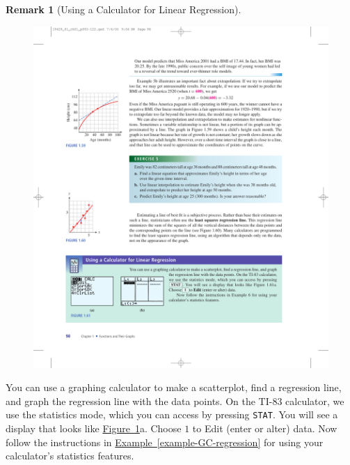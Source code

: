\documentclass[10pt,]{book}
\theoremstyle{plain}
\theoremstyle{definition}
\newtheorem{remark}[theorem]{Remark}
\theoremstyle{definition}
\theoremstyle{definition}
\theoremstyle{definition}
\numberwithin{equation}{part}
\begin{document}
\begin{remark}[Using a Calculator for Linear Regression]\label{remark-8}
\begin{figure}
\centering
\includegraphics[width=0.8\linewidth]{images/fig-GC-lists}
\caption{\label{fig-GC-lists}}
\end{figure}
You can use a graphing calculator to make a scatterplot, find a regression line, and graph the regression line with the data points. On the TI-83 calculator, we use the statistics mode, which you can access by pressing \lstinline?STAT?. You will see a display that looks like \hyperref[fig-GC-lists]{Figure~\ref{fig-GC-lists}}a. Choose \(1\) to Edit (enter or alter) data. Now follow the instructions in \hyperref[example-GC-regression]{Example~\ref{example-GC-regression}} for using your calculator’s statistics features.%
\end{remark}
\end{document}
